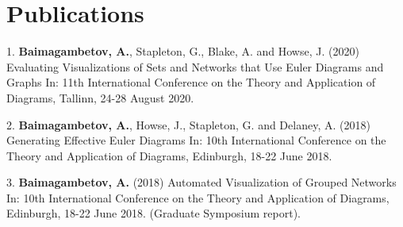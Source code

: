 \documentclass[a4paper,11pt]{article} %
\begin{document}
\section{Publications}

1. \textbf{Baimagambetov, A.}, Stapleton, G., Blake, A. and Howse, J. (2020)
Evaluating Visualizations of Sets and Networks that Use Euler Diagrams and Graphs In:
11th International Conference on the Theory and Application of Diagrams, Tallinn, 24-28 August 2020.

2. \textbf{Baimagambetov, A.}, Howse, J., Stapleton, G. and Delaney, A. (2018)
Generating Effective Euler Diagrams In:
10th International Conference on the Theory and Application of Diagrams, Edinburgh, 18-22 June 2018.

3. \textbf{Baimagambetov, A.} (2018)
Automated Visualization of Grouped Networks In:
10th International Conference on the Theory and Application of Diagrams, Edinburgh, 18-22 June 2018.
(Graduate Symposium report).
\end{document}
